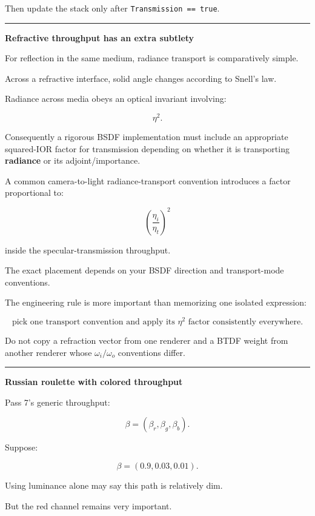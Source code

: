 Then update the stack only after \texttt{Transmission\ ==\ true}.

\begin{center}\rule{0.5\linewidth}{0.5pt}\end{center}

\textbf{Refractive throughput has an extra subtlety}

For reflection in the same medium, radiance transport is comparatively simple.

Across a refractive interface, solid angle changes according to Snell's law.

Radiance across media obeys an optical invariant involving:

\[
\eta^2.
\]

Consequently a rigorous BSDF implementation must include an appropriate squared-IOR factor for transmission depending on whether it is transporting \textbf{radiance} or its adjoint/importance.

A common camera-to-light radiance-transport convention introduces a factor proportional to:

\[
\boxed{
\left(
\frac{\eta_i}{\eta_t}
\right)^2
}
\]

inside the specular-transmission throughput.

The exact placement depends on your BSDF direction and transport-mode conventions.

The engineering rule is more important than memorizing one isolated expression:

\[
\boxed{
\text{pick one transport convention and apply its } \eta^2 \text{ factor consistently everywhere}.
}
\]

Do not copy a refraction vector from one renderer and a BTDF weight from another renderer whose \(\omega_i/\omega_o\) conventions differ.

\begin{center}\rule{0.5\linewidth}{0.5pt}\end{center}

\textbf{Russian roulette with colored throughput}

Pass 7's generic throughput:

\[
\beta=
(\beta_r,\beta_g,\beta_b).
\]

Suppose:

\[
\beta=
(0.9,0.03,0.01).
\]

Using luminance alone may say this path is relatively dim.

But the red channel remains very important.

